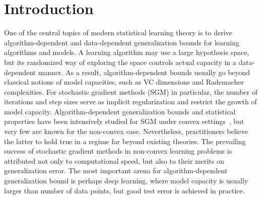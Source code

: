 \documentclass[final,12pt]{colt2018} %
\begin{document}
\section{Introduction}
One of the central topics of modern statistical learning theory is to derive algorithm-dependent and data-dependent generalization bounds for learning algorithms and models. A learning algorithm may use a large hypothesis space, but its randomized way of exploring the space controls actual capacity in a data-dependent manner. As a result, algorithm-dependent bounds usually go beyond classical notions of model capacities, such as VC dimensions and Rademacher complexities. For stochastic gradient methods (SGM) in particular, the number of iterations and step sizes serve as implicit regularization and restrict the growth of model capacity. Algorithm-dependent generalization bounds and statistical properties have been intensively studied for SGM under convex settings~\citep{hardt2015train,lin2016optimal,lin2016generalization,wei2017early,chen2016statistical}, but very few are known for the non-convex case. Nevertheless, practitioners believe the latter to hold true in a regime far beyond existing theories. The prevailing success of stochastic gradient methods in non-convex learning problems is attributed not only to computational speed, but also to their merits on generalization error. The most important arena for algorithm-dependent generalization bound is perhaps deep learning, where model capacity is usually larger than number of data points, but good test error is achieved in practice.
\end{document}

